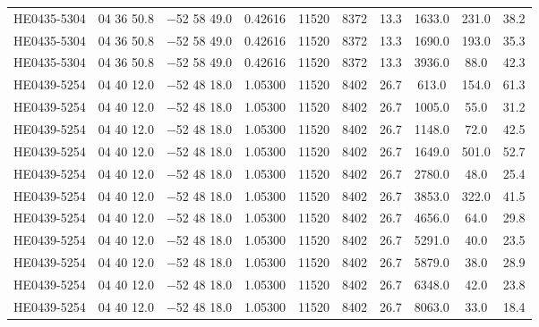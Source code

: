 \begin{landscape}
\begin{center}
\begin{longtable}{l c c c c c c c c c}
HE0435-5304  &             04 36 50.8  &         $-$52 58 49.0  &       0.42616  & 11520  &   8372  &       13.3  &      1633.0  &  231.0  &  38.2  \\
HE0435-5304  &             04 36 50.8  &         $-$52 58 49.0  &       0.42616  & 11520  &   8372  &       13.3  &      1690.0  &  193.0  &  35.3  \\
HE0435-5304  &             04 36 50.8  &         $-$52 58 49.0  &       0.42616  & 11520  &   8372  &       13.3  &      3936.0  &  88.0  &   42.3  \\
HE0439-5254  &             04 40 12.0  &         $-$52 48 18.0  &       1.05300  & 11520  &   8402  &       26.7  &      613.0  &   154.0  &  61.3  \\
HE0439-5254  &             04 40 12.0  &         $-$52 48 18.0  &       1.05300  & 11520  &   8402  &       26.7  &      1005.0  &  55.0  &   31.2  \\
HE0439-5254  &             04 40 12.0  &         $-$52 48 18.0  &       1.05300  & 11520  &   8402  &       26.7  &      1148.0  &  72.0  &   42.5  \\
HE0439-5254  &             04 40 12.0  &         $-$52 48 18.0  &       1.05300  & 11520  &   8402  &       26.7  &      1649.0  &  501.0  &  52.7  \\
HE0439-5254  &             04 40 12.0  &         $-$52 48 18.0  &       1.05300  & 11520  &   8402  &       26.7  &      2780.0  &  48.0  &   25.4  \\
HE0439-5254  &             04 40 12.0  &         $-$52 48 18.0  &       1.05300  & 11520  &   8402  &       26.7  &      3853.0  &  322.0  &  41.5  \\
HE0439-5254  &             04 40 12.0  &         $-$52 48 18.0  &       1.05300  & 11520  &   8402  &       26.7  &      4656.0  &  64.0  &   29.8  \\
HE0439-5254  &             04 40 12.0  &         $-$52 48 18.0  &       1.05300  & 11520  &   8402  &       26.7  &      5291.0  &  40.0  &   23.5  \\
HE0439-5254  &             04 40 12.0  &         $-$52 48 18.0  &       1.05300  & 11520  &   8402  &       26.7  &      5879.0  &  38.0  &   28.9  \\
HE0439-5254  &             04 40 12.0  &         $-$52 48 18.0  &       1.05300  & 11520  &   8402  &       26.7  &      6348.0  &  42.0  &   23.8  \\
HE0439-5254  &             04 40 12.0  &         $-$52 48 18.0  &       1.05300  & 11520  &   8402  &       26.7  &      8063.0  &  33.0  &   18.4  \\

\end{longtable}
\end{center}
\end{landscape}
